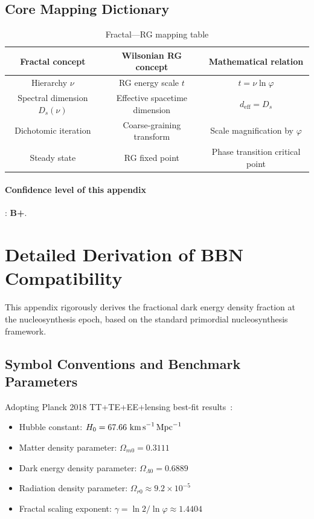 \documentclass[12pt,a4paper,twocolumn]{article}
\renewcommand{\phi}{\varphi}
\begin{document}
\subsection{Core Mapping Dictionary}
\begin{table}[H]
\centering
\footnotesize
\caption{Fractal---RG mapping table}
\begin{tabular}{c|c|c}
\hline
\textbf{Fractal concept} & \textbf{Wilsonian RG concept} & \textbf{Mathematical relation} \\
\hline
Hierarchy $\nu$ & RG energy scale $t$ & $t=\nu\ln\phi$ \\
Spectral dimension $D_s(\nu)$ & Effective spacetime dimension & $d_{\text{eff}}=D_s$ \\
Dichotomic iteration & Coarse-graining transform & Scale magnification by $\phi$ \\
Steady state & RG fixed point & Phase transition critical point \\
\hline
\end{tabular}
\end{table}

\paragraph{Confidence level of this appendix}: \textbf{B+}.

\section{Detailed Derivation of BBN Compatibility}
\label{app:bbn}

This appendix rigorously derives the fractional dark energy density fraction at the nucleosynthesis epoch, based on the standard primordial nucleosynthesis framework.

\subsection{Symbol Conventions and Benchmark Parameters}
Adopting Planck 2018 TT+TE+EE+lensing best-fit results~\cite{Planck2020}:
\begin{itemize}
\item Hubble constant: $H_0 = 67.66\ \text{km\,s}^{-1}\,\text{Mpc}^{-1}$
\item Matter density parameter: $\Omega_{m0} = 0.3111$
\item Dark energy density parameter: $\Omega_{\Lambda0} = 0.6889$
\item Radiation density parameter: $\Omega_{r0} \approx 9.2\times10^{-5}$
\item Fractal scaling exponent: $\gamma = \ln2/\ln\phi \approx 1.4404$
\end{itemize}
\end{document}
